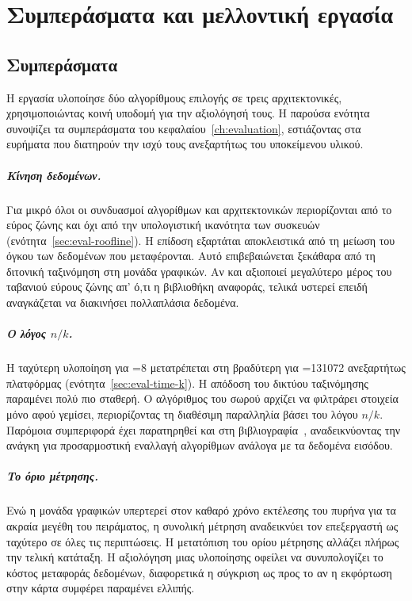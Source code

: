 \chapter{Συμπεράσματα και μελλοντική εργασία}
\label{ch:conclusions}

\section{Συμπεράσματα}
\label{sec:concl-summary}

Η εργασία υλοποίησε δύο αλγορίθμους επιλογής  σε τρεις
αρχιτεκτονικές, χρησιμοποιώντας κοινή υποδομή για την αξιολόγησή τους. Η
παρούσα ενότητα συνοψίζει τα συμπεράσματα του κεφαλαίου~\ref{ch:evaluation},
εστιάζοντας στα ευρήματα που διατηρούν την ισχύ τους ανεξαρτήτως του
υποκείμενου υλικού.

\paragraph{Κίνηση δεδομένων.} Για μικρό  όλοι οι συνδυασμοί αλγορίθμων
και αρχιτεκτονικών περιορίζονται από το εύρος ζώνης και όχι από την
υπολογιστική ικανότητα των συσκευών (ενότητα~\ref{sec:eval-roofline}). Η
επίδοση εξαρτάται αποκλειστικά από τη μείωση του όγκου των δεδομένων που
μεταφέρονται. Αυτό επιβεβαιώνεται ξεκάθαρα από τη διτονική ταξινόμηση στη
μονάδα γραφικών. Αν και αξιοποιεί μεγαλύτερο μέρος του ταβανιού εύρους ζώνης
απ' ό,τι η βιβλιοθήκη αναφοράς, τελικά υστερεί επειδή αναγκάζεται να διακινήσει
πολλαπλάσια δεδομένα.

\paragraph{Ο λόγος $n/k$.} Η ταχύτερη υλοποίηση για =8 μετατρέπεται στη
βραδύτερη για =131072 ανεξαρτήτως πλατφόρμας
(ενότητα~\ref{sec:eval-time-k}). Η απόδοση του δικτύου ταξινόμησης παραμένει
πολύ πιο σταθερή. Ο αλγόριθμος του σωρού αρχίζει να φιλτράρει στοιχεία μόνο
αφού γεμίσει, περιορίζοντας τη διαθέσιμη παραλληλία βάσει του λόγου $n/k$.
Παρόμοια συμπεριφορά έχει παρατηρηθεί και στη
βιβλιογραφία~\cite{lin2026adaptivetopk}, αναδεικνύοντας την ανάγκη για
προσαρμοστική εναλλαγή αλγορίθμων ανάλογα με τα δεδομένα εισόδου.

\paragraph{Το όριο μέτρησης.} Ενώ η μονάδα γραφικών υπερτερεί στον καθαρό χρόνο
εκτέλεσης του πυρήνα για τα ακραία μεγέθη του πειράματος, η συνολική
 μέτρηση αναδεικνύει τον επεξεργαστή ως ταχύτερο σε όλες τις
περιπτώσεις. Η μετατόπιση του ορίου μέτρησης αλλάζει πλήρως την τελική
κατάταξη. Η αξιολόγηση μιας υλοποίησης οφείλει να συνυπολογίζει το κόστος
μεταφοράς δεδομένων, διαφορετικά η σύγκριση ως προς το αν η εκφόρτωση στην
κάρτα συμφέρει παραμένει ελλιπής.

